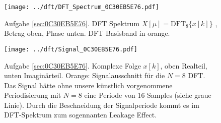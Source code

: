 \begin{figure}
\centering
\texttt{[image: ../dft/DFT\_Spectrum\_0C30EB5E76.pdf]}
\caption{Aufgabe \ref{sec:0C30EB5E76}. DFT Spektrum $X[\mu]=\mathrm{DFT}_8\{x[k]\}$ ,
Betrag oben, Phase unten. DFT Basisband in orange.}
\label{fig:DFT_Spectrum_0C30EB5E76}
\end{figure}
%
\begin{figure}
\centering
\texttt{[image: ../dft/Signal\_0C30EB5E76.pdf]}
\caption{Aufgabe \ref{sec:0C30EB5E76}. Komplexe Folge $x[k]$, oben Realteil,
unten Imaginärteil. Orange: Signalausschnitt für die $N=8$ DFT. Das Signal
hätte ohne unsere künstlich vorgenommene Periodisierung mit $N=8$
eine Periode von 16 Samples (siehe graue Linie). Durch die Beschneidung der
Signalperiode kommt es im DFT-Spektrum
 zum sogennanten Leakage Effect.}
\label{fig:Signal_0C30EB5E76}
\end{figure}







\clearpage

